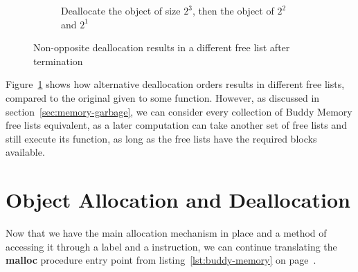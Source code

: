 \begin{figure}[ht]
\begin{subfigure}[t]{.5\textwidth}
        \caption{\footnotesize Deallocate the object of size $2^3$, then the object of $2^2$ and $2^1$}
    \end{subfigure}%
    \caption{Non-opposite deallocation results in a different free list after termination}
    \label{fig:deallocation-order-free-list}
\end{figure}

Figure~\ref{fig:deallocation-order-free-list} shows how alternative deallocation orders results in different free lists, compared to the original given to some function. However, as discussed in section~\ref{sec:memory-garbage}, we can consider every collection of Buddy Memory free lists equivalent, as a later computation can take another set of free lists and still execute its function, as long as the free lists have the required blocks available.

\newpage
\section{Object Allocation and Deallocation}
\label{sec:object-allocation-deallocation}
Now that we have the main allocation mechanism in place and a method of accessing it through a label and a  instruction, we can continue translating the \textbf{malloc} procedure entry point from listing~\ref{lst:buddy-memory} on page~\pageref{lst:buddy-memory}.

